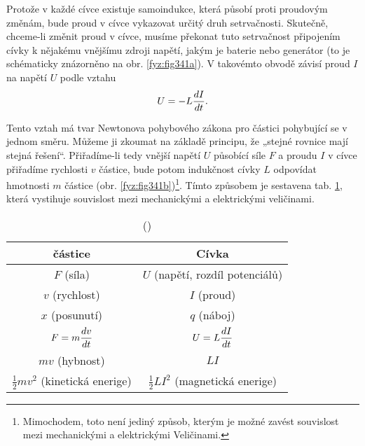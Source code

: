 {  Protože v každé cívce existuje samoindukce, která působí proti proudovým změnám, bude proud v 
  cívce vykazovat určitý druh setrvačnosti. Skutečně, chceme-li změnit proud v cívce, musíme 
  překonat tuto setrvačnost připojením cívky k nějakému vnějšímu zdroji napětí, jakým je baterie 
  nebo generátor (to je schématicky znázorněno na obr. \ref{fyz:fig341a}). V takovémto obvodě 
  závisí proud \(I\) na napětí \(U\) podle vztahu
  \begin{equation}\label{fyz:eq419}
    U = - L\dfrac{d I}{d t}.
  \end{equation}
  
  Tento vztah má tvar Newtonova pohybového zákona pro částici pohybující se v jednom směru. Můžeme 
  ji zkoumat na základě principu, že „stejné rovnice mají stejná řešení“. Přiřadíme-li tedy vnější 
  napětí \(U\) působící síle \(F\) a proudu \(I\) v cívce přiřadíme rychlosti \(v\) částice, bude 
  potom indukčnost cívky \(L\) odpovídat hmotnosti \(m\) částice (obr. 
  \ref{fyz:fig341b})\footnote{Mimochodem, toto není jediný způsob, kterým je možné zavést 
  souvislost mezi mechanickými a elektrickými Veličinami.}. Tímto způsobem je sestavena tab. 
  \ref{fyz:tab009}, která vystihuje souvislost mezi mechanickými a elektrickými veličinami.

  \begin{table}[ht!] %
    \centering
    \renewcommand{\arraystretch}{1.4}
    \begin{tabular}{c|c}
           \hline \textbf{částice}  & \textbf{Cívka}                            \\ \hline
                       \(F\) (síla) & \(U\) (napětí, rozdíl potenciálů)         \\
                \(v\) (rychlost)    & \(I\) (proud)                             \\
                \(x\) (posunutí)    & \(q\) (náboj)                             \\
                \(F = m\dfrac{d v}{d t}\) & \(U = L\dfrac{d I}{d t}\)                       \\
                \(mv\) (hybnost)    & \(LI\)                                    \\
       \(\frac{1}{2}mv^2\) (kinetická enerige) & \(\frac{1}{2}LI^2\) (magnetická enerige)     \\
       \hline 
    \end{tabular}
    \caption{(\cite[s.~308]{Feynman01})}
    \label{fyz:tab009}
  \end{table}
    
}
